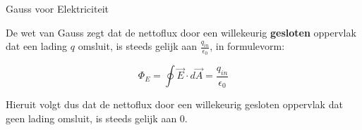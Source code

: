 \begin{lem}{Gauss voor Elektriciteit}

    De wet van Gauss zegt dat de nettoflux door een willekeurig \textbf{gesloten} oppervlak dat een lading $ q $ omsluit, is steeds gelijk aan $ \tfrac{q_{in}}{\epsilon_0} $, in formulevorm:
    
    \begin{equation*}
        \Phi_E = \oint \Vec{E}\cdot d\Vec{A} = \dfrac{q_{in}}{\epsilon_0}
    \end{equation*}
    
    \noindent Hieruit volgt dus dat de nettoflux door een willekeurig gesloten oppervlak dat geen lading omsluit, is steeds gelijk aan 0. 
\end{lem}





